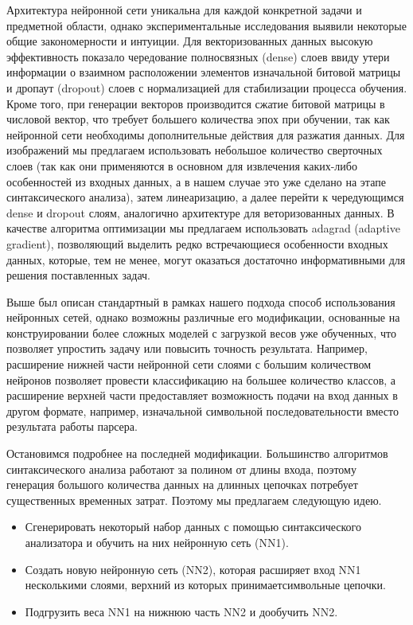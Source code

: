 \documentclass[14pt]{matmex-diploma-custom}
\begin{document}
Архитектура нейронной сети уникальна для каждой конкретной задачи и предметной области, однако экспериментальные исследования выявили некоторые общие закономерности и интуиции. Для векторизованных данных высокую эффективность показало чередование полносвязных (dense) слоев ввиду утери информации о взаимном расположении элементов изначальной битовой матрицы и дропаут (dropout) слоев с нормализацией для стабилизации процесса обучения. Кроме того, при генерации векторов производится сжатие битовой матрицы в числовой вектор, что требует большего количества эпох при обучении, так как нейронной сети необходимы дополнительные действия для разжатия данных. Для изображений мы предлагаем использовать небольшое количество сверточных слоев (так как они применяются в основном для извлечения каких-либо особенностей из входных данных, а в нашем случае это уже сделано на этапе синтаксического анализа), затем линеаризацию, а далее перейти к чередующимся dense и dropout слоям, аналогично архитектуре для веторизованных данных. В качестве алгоритма оптимизации мы предлагаем использовать adagrad (adaptive gradient), позволяющий выделить редко встречающиеся особенности входных данных, которые, тем не менее, могут оказаться достаточно информативными для решения поставленных задач.

Выше был описан стандартный в рамках нашего подхода способ использования нейронных сетей, однако возможны различные его модификации, основанные на конструировании более сложных моделей с загрузкой весов уже обученных, что позволяет упростить задачу или повысить точность результата. Например, расширение нижней части нейронной сети слоями с большим количеством нейронов позволяет провести классификацию на большее количество классов, а расширение верхней части предоставляет возможность подачи на вход данных в другом формате, например, изначальной символьной последовательности вместо результата работы парсера.

Остановимся подробнее на последней модификации. Большинство алгоритмов синтаксического анализа работают за полином от длины входа, поэтому генерация большого количества данных на длинных цепочках потребует существенных временных затрат. Поэтому мы предлагаем следующую идею.
\begin{itemize}
    \item Сгенерировать некоторый набор данных с помощью синтаксического анализатора и обучить на них нейронную сеть (NN1).
    \item Создать новую нейронную сеть (NN2), которая расширяет вход NN1 несколькими слоями, верхний из которых принимает\linebreak символьные цепочки.
    \item Подгрузить веса NN1 на нижнюю часть NN2 и дообучить NN2.
\end{itemize}
\end{document}
